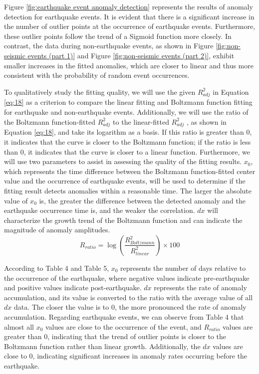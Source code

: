 \documentclass[3p,authoryear,preprint,12pt]{elsarticle}
\begin{document}
Figure \ref{fig:earthquake event anomaly detection} represents the results of anomaly detection for earthquake events. It is evident that there is a significant increase in the number of outlier points at the occurrence of earthquake events. Furthermore, these outlier points follow the trend of a Sigmoid function more closely. In contrast, the data during non-earthquake events, as shown in Figure \ref{fig:non-seismic events (part 1)} and Figure \ref{fig:non-seismic events (part 2)}, exhibit smaller increases in the fitted anomalies, which are closer to linear and thus more consistent with the probability of random event occurrences.

To qualitatively study the fitting quality, we will use the given $R_{adj}^2$  in {Equation} \ref{eq:18} as a criterion to compare the linear fitting and Boltzmann function fitting for earthquake and non-earthquake events. Additionally, we will use the ratio of the Boltzmann function-fitted $R_{adj}^2$  to the linear-fitted $R_{adj}^2$ , as shown in {Equation} \ref{eq:18}, and take its logarithm as a basis. If this ratio is greater than 0, it indicates that the curve is closer to the Boltzmann function; if the ratio is less than 0, it indicates that the curve is closer to a linear function. Furthermore, we will use two parameters to assist in assessing the quality of the fitting results. {$x_0$}, which represents the time difference between the Boltzmann function-fitted center value and the occurrence of earthquake events, will be used to determine if the fitting result detects anomalies within a reasonable time. {The larger the absolute value of $x_0$ is, the greater the difference between the detected anomaly and the earthquake occurrence time is, and the weaker the correlation.} $dx$  will characterize the growth trend of the Boltzmann function and can indicate the magnitude of anomaly amplitudes.
\begin{equation}
	\label{eq:19}
	R_{ratio} = \log(\frac{R_{Boltzmann}^2}{R_{linear}^2}) \times 100
\end{equation}

According to Table 4 and Table 5, $x_0$  represents the number of days relative to the occurrence of the earthquake, where negative values indicate pre-earthquake and positive values indicate post-earthquake. $dx$  represents the rate of anomaly accumulation, and its value is converted to the ratio with the average value of all $dx$  data. The closer the value is to 0, the more pronounced the rate of anomaly accumulation. Regarding earthquake events, we can observe from Table 4 that almost all $x_0$  values are close to the occurrence of the event, and $R_{ratio}$ values are greater than 0, indicating that the trend of outlier points is closer to the Boltzmann function rather than linear growth. Additionally, the {$dx$}  values are close to 0, indicating significant increases in anomaly rates occurring before the earthquake.
\end{document}
